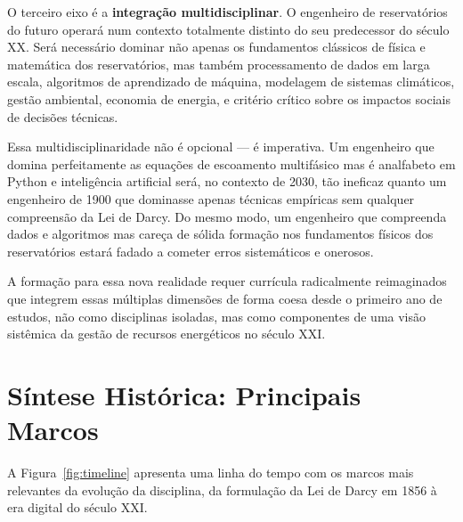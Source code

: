 \documentclass[
  12pt,
  a4paper,
  oneside,
  brazilian,
  sumario=tradicional
]{abntex2}
\begin{document}
O terceiro eixo é a \textbf{integração multidisciplinar}. O engenheiro
de reservatórios do futuro operará num contexto totalmente distinto do
seu predecessor do século XX. Será necessário dominar não apenas os
fundamentos clássicos de física e matemática dos reservatórios, mas
também processamento de dados em larga escala, algoritmos de
aprendizado de máquina, modelagem de sistemas climáticos, gestão
ambiental, economia de energia, e critério crítico sobre os impactos
sociais de decisões técnicas.

Essa multidisciplinaridade não é opcional — é imperativa. Um engenheiro
que domina perfeitamente as equações de escoamento multifásico mas é
analfabeto em Python e inteligência artificial será, no contexto de
2030, tão ineficaz quanto um engenheiro de 1900 que dominasse apenas
técnicas empíricas sem qualquer compreensão da Lei de Darcy. Do mesmo
modo, um engenheiro que compreenda dados e algoritmos mas careça de
sólida formação nos fundamentos físicos dos reservatórios estará fadado
a cometer erros sistemáticos e onerosos.

A formação para essa nova realidade requer currícula radicalmente
reimaginados que integrem essas múltiplas dimensões de forma coesa desde
o primeiro ano de estudos, não como disciplinas isoladas, mas como
componentes de uma visão sistêmica da gestão de recursos energéticos
no século XXI.

\section{Síntese Histórica: Principais Marcos}
\label{sec:sintese}

A Figura~\ref{fig:timeline} apresenta uma linha do tempo com os marcos
mais relevantes da evolução da disciplina, da formulação da Lei de
Darcy em 1856 à era digital do século XXI.
\end{document}
